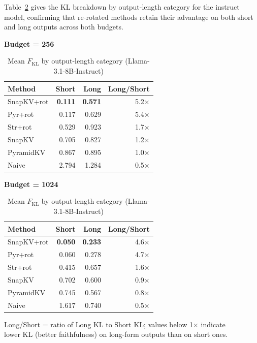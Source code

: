 \documentclass[10pt,letterpaper]{article}
\begin{document}
Table~\ref{tab:instruct-kl-shortlong} gives the KL breakdown by output-length category for the instruct model, confirming that re-rotated methods retain their advantage on both short and long outputs across both budgets.

\begin{table}[H]
\centering
\small
\caption{Mean \(F_{\text{KL}}\) by output-length category (Llama-3.1-8B-Instruct)}
\label{tab:instruct-kl-shortlong}
\begin{minipage}[t]{0.47\textwidth}
\centering
\textbf{Budget = 256}\\[4pt]
\begin{tabular}{@{}lrrr@{}}
\toprule
Method & Short & Long & Long/Short\\
\midrule
SnapKV+rot & \textbf{0.111} & \textbf{0.571} & 5.2$\times$\\
Pyr+rot    & 0.117 & 0.629 & 5.4$\times$\\
Str+rot   & 0.529 & 0.923 & 1.7$\times$\\
SnapKV     & 0.705 & 0.827 & 1.2$\times$\\
PyramidKV  & 0.867 & 0.895 & 1.0$\times$\\
Naive      & 2.794 & 1.284 & 0.5$\times$\\
\bottomrule
\end{tabular}
\end{minipage}
\hfill
\begin{minipage}[t]{0.47\textwidth}
\centering
\textbf{Budget = 1024}\\[4pt]
\begin{tabular}{@{}lrrr@{}}
\toprule
Method & Short & Long & Long/Short\\
\midrule
SnapKV+rot & \textbf{0.050} & \textbf{0.233} & 4.6$\times$\\
Pyr+rot    & 0.060 & 0.278 & 4.7$\times$\\
Str+rot   & 0.415 & 0.657 & 1.6$\times$\\
SnapKV     & 0.702 & 0.600 & 0.9$\times$\\
PyramidKV  & 0.745 & 0.567 & 0.8$\times$\\
Naive      & 1.617 & 0.740 & 0.5$\times$\\
\bottomrule
\end{tabular}
\end{minipage}

\medskip
Long/Short = ratio of Long KL to Short KL; values below 1$\times$ indicate
\\lower KL (better faithfulness) on long-form outputs than on short ones.
\end{table}
\end{document}
